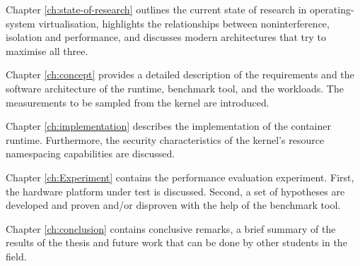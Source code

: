 Chapter \ref{ch:state-of-research} outlines the current state of research in operating-system 
virtualisation, highlights the relationships between noninterference, isolation and performance, and
discusses modern architectures that try to maximise all three.     

Chapter \ref{ch:concept} provides a detailed description of the requirements and the software architecture 
of the runtime, benchmark tool, and the workloads. The measurements to be sampled from the kernel are introduced.

Chapter \ref{ch:implementation} describes the implementation of the container runtime. Furthermore,
the security characteristics of the kernel's resource namespacing capabilities are discussed.

Chapter \ref{ch:Experiment} contains the performance evaluation experiment. First, the hardware 
platform under test is discussed. Second, a set of hypotheses are developed and proven and/or 
disproven with the help of the benchmark tool.  

Chapter \ref{ch:conclusion} contains conclusive remarks, a brief summary of the results of the thesis
and future work that can be done by other students in the field. 
